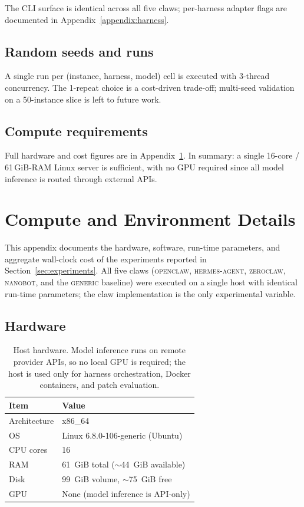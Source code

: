 \documentclass{llmxive}
\begin{document}
The CLI surface is identical across all five claws; per-harness adapter flags are documented in Appendix~\ref{appendix:harness}.

\subsection{Random seeds and runs}

A single run per (instance, harness, model) cell is executed with 3-thread concurrency. The 1-repeat choice is a cost-driven trade-off; multi-seed validation on a 50-instance slice is left to future work.

\subsection{Compute requirements}

Full hardware and cost figures are in Appendix~\ref{appendix:compute}. In summary: a single 16-core / 61\,GiB-RAM Linux server is sufficient, with no GPU required since all model inference is routed through external APIs.

\section{ Compute and Environment Details}\label{appendix:compute}

This appendix documents the hardware, software, run-time parameters, and aggregate
wall-clock cost of the experiments reported in Section~\ref{sec:experiments}. All five
claws (\textsc{openclaw}, \textsc{hermes-agent}, \textsc{zeroclaw}, \textsc{nanobot},
and the \textsc{generic} baseline)
were executed on a single host with identical run-time parameters; the claw
implementation is the only experimental variable.

\subsection{Hardware}

\begin{table}[!htbp]
\centering
\small
\begin{tabular}{ll}
\toprule
\textbf{Item} & \textbf{Value} \\
\midrule
Architecture & x86\_64 \\
OS           & Linux 6.8.0-106-generic (Ubuntu) \\
CPU cores    & 16 \\
RAM          & 61~GiB total ($\sim$44~GiB available) \\
Disk         & 99~GiB volume, $\sim$75~GiB free \\
GPU          & None (model inference is API-only) \\
\bottomrule
\end{tabular}
\caption{Host hardware. Model inference runs on remote provider APIs, so no local
GPU is required; the host is used only for harness orchestration, Docker
containers, and patch evaluation.}
\label{tab:appx-d-hardware}
\end{table}
\end{document}
